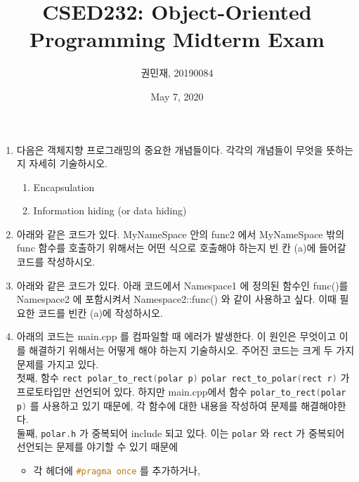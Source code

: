 \documentclass{article}
\newcommand{\inline}[1]{%
    \colorbox{beta-gray}{\lstinline[language=C++]{#1}}%
}
\begin{document}
    \author{권민재, 20190084}
    \title{CSED232: Object-Oriented Programming Midterm Exam}
    \date{May 7, 2020}
    \maketitle


    \begin{enumerate}[itemsep=30pt]
        \item 다음은 객체지향 프로그래밍의 중요한 개념들이다. 각각의 개념들이 무엇을 뜻하는지 자세히 기술하시오.
              \begin{enumerate}[label={\alph*.}]
                  \item Encapsulation
                  \item Information hiding (or data hiding)
              \end{enumerate}
        \item 아래와 같은 코드가 있다. MyNameSpace 안의 func2 에서 MyNameSpace 밖의 func 함수를 호출하기 위해서는 어떤 식으로 호출해야 하는지 빈 칸 (a)에 들어갈 코드를 작성하시오.
        \item 아래와 같은 코드가 있다. 아래 코드에서 Namespace1 에 정의된 함수인 func()를 Namespace2 에 포함시켜서 Namespace2::func() 와 같이 사용하고 싶다. 이때 필요한 코드를 빈칸 (a)에 작성하시오.
        \item 아래의 코드는 main.cpp 를 컴파일할 때 에러가 발생한다. 이 원인은 무엇이고 이를 해결하기 위해서는 어떻게 해야 하는지 기술하시오.
              주어진 코드는 크게 두 가지 문제를 가지고 있다. \\
              첫째, 함수 \inline{rect polar_to_rect(polar p)}\inline{polar rect_to_polar(rect r)}가 프로토타입만 선언되어 있다.
              하지만\; main.cpp에서 함수 \inline{polar_to_rect(polar p)}를 사용하고 있기 때문에, 각 함수에 대한 내용을 작성하여 문제를 해결해야한다. \\
              둘째, \inline{polar.h}가 중복되어 include 되고 있다. 이는 \inline{polar}와 \inline{rect}가 중복되어 선언되는 문제를 야기할 수 있기 때문에
              \begin{itemize}
                  \item 각 헤더에 \inline{#pragma once}를 추가하거나,

\end{itemize}
\end{enumerate}
\end{document}
